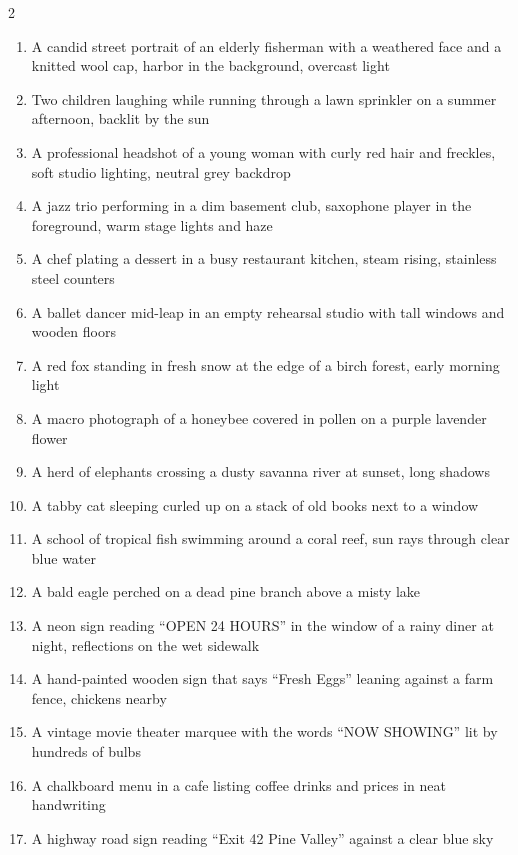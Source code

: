 {\fontsize{8}{8.8}\selectfont
\begin{multicols}{2}
\begin{enumerate}[leftmargin=2.1em,itemsep=0pt,topsep=0pt,parsep=0pt]
  \item A candid street portrait of an elderly fisherman with a weathered face and a knitted wool cap, harbor in the background, overcast light
  \item Two children laughing while running through a lawn sprinkler on a summer afternoon, backlit by the sun
  \item A professional headshot of a young woman with curly red hair and freckles, soft studio lighting, neutral grey backdrop
  \item A jazz trio performing in a dim basement club, saxophone player in the foreground, warm stage lights and haze
  \item A chef plating a dessert in a busy restaurant kitchen, steam rising, stainless steel counters
  \item A ballet dancer mid-leap in an empty rehearsal studio with tall windows and wooden floors
  \item A red fox standing in fresh snow at the edge of a birch forest, early morning light
  \item A macro photograph of a honeybee covered in pollen on a purple lavender flower
  \item A herd of elephants crossing a dusty savanna river at sunset, long shadows
  \item A tabby cat sleeping curled up on a stack of old books next to a window
  \item A school of tropical fish swimming around a coral reef, sun rays through clear blue water
  \item A bald eagle perched on a dead pine branch above a misty lake
  \item A neon sign reading ``OPEN 24 HOURS'' in the window of a rainy diner at night, reflections on the wet sidewalk
  \item A hand-painted wooden sign that says ``Fresh Eggs'' leaning against a farm fence, chickens nearby
  \item A vintage movie theater marquee with the words ``NOW SHOWING'' lit by hundreds of bulbs
  \item A chalkboard menu in a cafe listing coffee drinks and prices in neat handwriting
  \item A highway road sign reading ``Exit 42 Pine Valley'' against a clear blue sky

\end{enumerate}
\end{multicols}}
